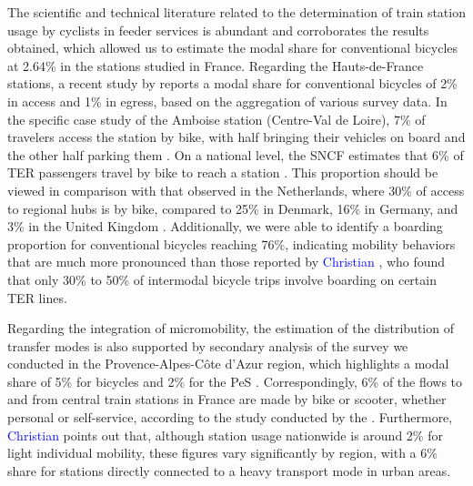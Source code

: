 \begin{refsegment}
The scientific and technical literature related to the determination of train station usage by cyclists in feeder services is abundant and corroborates the results obtained, which allowed us to estimate the modal share for conventional bicycles at 2.64\% in the stations studied in France. Regarding the Hauts-de-France stations, a recent study by \textcolor{blue}{\textcite[20]{hasiak_estimation_2023}} reports a modal share for conventional bicycles of 2\% in \gls{access} and 1\% in \gls{egress}, based on the aggregation of various survey data. In the specific case study of the Amboise station (Centre-Val de Loire), 7\% of travelers access the station by bike, with half bringing their vehicles on board and the other half parking them \textcolor{blue}{\autocite[744]{midenet_modal_2018}}. On a national level, the SNCF estimates that 6\% of \acrshort{TER} passengers travel by bike to reach a station \textcolor{blue}{\autocite[9]{coue_embarq_2021}}. This proportion should be viewed in comparison with that observed in the Netherlands, where 30\% of access to regional hubs is by bike, compared to 25\% in Denmark, 16\% in Germany, and 3\% in the United Kingdom \textcolor{blue}{\autocite[285]{martens_bicycle_2004}}. Additionally, we were able to identify a boarding proportion for conventional bicycles reaching 76\%, indicating mobility behaviors that are much more pronounced than those reported by \textcolor{blue}{Christian} \textcolor{blue}{\textcite[5]{gioria_etude_2016}}, who found that only 30\% to 50\% of intermodal bicycle trips involve boarding on certain \acrshort{TER} lines.%

Regarding the integration of micromobility, the estimation of the distribution of transfer modes is also supported by secondary analysis of the survey we conducted in the Provence-Alpes-Côte d'Azur region, which highlights a modal share of 5\% for bicycles and 2\% for the \acrshort{PeS} \textcolor{blue}{\autocite[180]{moinse_intermodal_2022}}. Correspondingly, 6\% of the flows to and from central train stations in France are made by bike or scooter, whether personal or self-service, according to the study conducted by the \textcolor{blue}{\textcite[18]{enov_enquete_2021}}. Furthermore, \textcolor{blue}{Christian} \textcolor{blue}{\textcite[5]{gioria_etude_2016}} points out that, although station usage nationwide is around 2\% for light individual mobility, these figures vary significantly by region, with a 6\% share for stations directly connected to a heavy transport mode in urban areas.%


\end{refsegment}

